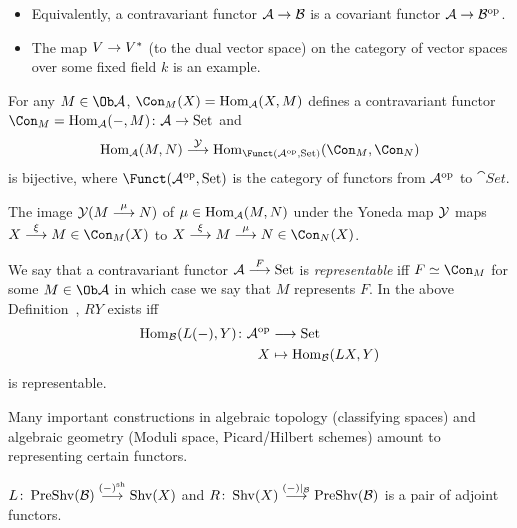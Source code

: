 \documentclass[a4paper,parskip=half,numbers=enddot, DIV=12]{scrreprt}
\begin{document}
	\begin{rem*}
        \begin{itemize}
          \item 
            Equivalently, a contravariant functor $\Aa\morphism \Bb$ is a covariant functor $\Aa\morphism \Bb^\op$.
          \item
            The map $V\morphism V^\ast$ (to the dual vector space) on the category of vector spaces over some fixed field $k$ is an example.
        \end{itemize}
	\end{rem*}
	\begin{lem} 
        For any $M\in\Ob \Aa$, $\Con_M(X) = \Hom_\Aa(X,M)$ defines a contravariant functor $\Con_M=\Hom_\Aa(-,M)\colon \Aa\morphism \cat{Set}$ and 
        \begin{align*}
            \Hom_\Aa(M,N) \morphism[\Yy] \Hom_{\Funct(\Aa^\op,\cat{Set})}(\Con_M,\Con_N)
        \end{align*}
        is bijective, where $\Funct(\Aa^\op,\cat{Set})$ is the category of functors from $\mathcal{A}^{\mathrm{op}}$ to $\cat{Set}$.
	\end{lem}
	\begin{rem*}
        \begin{alphanumerate}
	       \item 
	        The image $\Yy(M\morphism[\mu]N)$ of $\mu\in\operatorname{Hom}_{\mathcal{A}}(M,N)$ under the Yoneda map $\mathcal{Y}$ maps $X\morphism[\xi]M\in\Con_M(X)$ to $X\morphism[\xi]M\morphism[\mu]N\in\Con_N(X)$.
          \item
            We say that a contravariant functor $\Aa\morphism[F]\cat{Set}$ is \emph{representable} iff $F\simeq \Con_M$ for some $M\in\Ob\Aa$ in which case we say that $M$ represents $F$. In the above Definition~, $RY$ exists iff 
            \begin{align*}
            	\Hom_\Bb(L(-), Y)\colon\Aa^\op&\morphism\cat{Set}\\
            	X&\mapsto \Hom_\Bb(LX,Y)
            \end{align*}
            is representable.
          \item 
            Many important constructions in algebraic topology (classifying spaces) and algebraic geometry (Moduli space, Picard/Hilbert schemes) amount to representing certain functors.
          \item 
            $L\colon\cat{PreShv}(\Bb) \morphism[(-)^\sh] \cat{Shv}(X)$ and $R\colon\cat{Shv} (X) \morphism[(-)|_\Bb] \cat{PreShv}(\Bb)$ is a pair of adjoint functors.
        \end{alphanumerate}
	\end{rem*}
\end{document}
